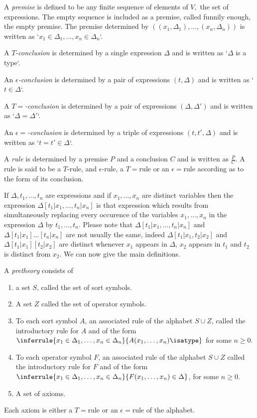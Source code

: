 A \emph{premise} is defined to be any finite sequence of elements of $V,$  the set of expressions. The empty sequence is included as a premise, called funnily enough, the empty premise.
%
The premise determined by $((x_1,\Delta_1),\ldots,(x_n,\Delta_n))$ is written as `$x_1\in\Delta_1,\ldots,x_n\in\Delta_n$`.

A \emph{$T$-conclusion} is determined by a single expression $\Delta$ and is written as `$\Delta$ is a type`.

An \emph{$\epsilon$-conclusion}  is determined by a pair of expressions $(t,\Delta)$ and is written as `$t\in\Delta$`.

A \emph{$T=$-conclusion} is determined by a pair of expressions $(\Delta,\Delta')$ and is written as `$\Delta=\Delta'$`.

An \emph{$\epsilon=$-conclusion} is determined by a triple of expressions $(t,t',\Delta)$ and is written as `$t=t'\in\Delta$`.

A \emph{rule} is determined by a premise $P$ and a conclusion $C$ and is written as $\frac{P}{C}$. A rule is said to be a $T$-rule, and $\epsilon$-rule, a $T=$rule or an $\epsilon=$rule according as to the form of its conclusion.

If $\Delta,t_1,\ldots,t_n$ are expressions and if $x_1,\ldots,x_n$ are distinct variables then the expression $\Delta[t_1|x_1,\ldots,t_n|x_n]$ is that expression which results from simultaneously replacing every occurence of the variables $x_1,\ldots,x_n$ in the expression $\Delta$ by $t_1,\ldots,t_n$.
%
Please note that $\Delta[t_1|x_1,\ldots,t_n|x_n]$ and $\Delta[t_1|x_1]\ldots[t_n|x_n]$ are not usually the same, indeed $\Delta[t_1|x_1,t_2|x_2]$ and $\Delta[t_1|x_1][t_2|x_2]$ are distinct whenever $x_1$ appears in $\Delta$, $x_2$ appears in $t_1$ and $t_2$ is distinct from $x_2$.
%
We can now give the main definitions.

\begin{definition}[1]
  A \emph{pretheory} consists of
  \begin{enumerate}
    \item a set $S$, called the set of sort symbols.%
    \item A set $Z$ called the set of operator symbols.
    \item To each sort symbol $A$, an associated rule of the alphabet $S\cup Z$, called the introductory rule for $A$ and of the form $\inferrule{x_1\in\Delta_1,\ldots,x_n\in\Delta_n}{A(x_1,\ldots,x_n) \isatype}$ for some $n\geq 0$.
    \item To each operator symbol $F$, an associated rule of the alphabet $S\cup Z$ called the introductory rule for $F$ and of the form $\inferrule{x_1\in\Delta_1,\ldots,x_n\in\Delta_n}{F(x_1,\ldots,x_n)\in\Delta}$, for some $n\geq 0$.
    \item A set of axioms.
  \end{enumerate}

  Each axiom is either a $T=$rule or an $\epsilon=$rule of the alphabet.
\end{definition}

